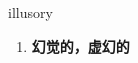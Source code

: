 
\begin{frame}
{\huge illusory}
\begin{center}
\begin{enumerate}\Large
  \item \textbf{幻觉的，虚幻的}
\end{enumerate}
\end{center}
\end{frame}
